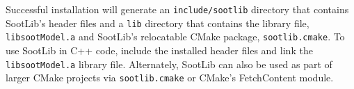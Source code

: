 \documentclass[preprint,letterpaper]{elsarticle}
\begin{document}
Successful installation will generate an \texttt{include/sootlib} directory that contains SootLib's header files and a \texttt{lib} directory that contains the library file, \texttt{libsootModel.a} and SootLib's relocatable CMake package, \texttt{sootlib.cmake}.
To use SootLib in C++ code, include the installed header files and link the \texttt{libsootModel.a} library file. Alternately, SootLib can also be used as part of larger CMake projects via \texttt{sootlib.cmake} or CMake's FetchContent module.
\end{document}
